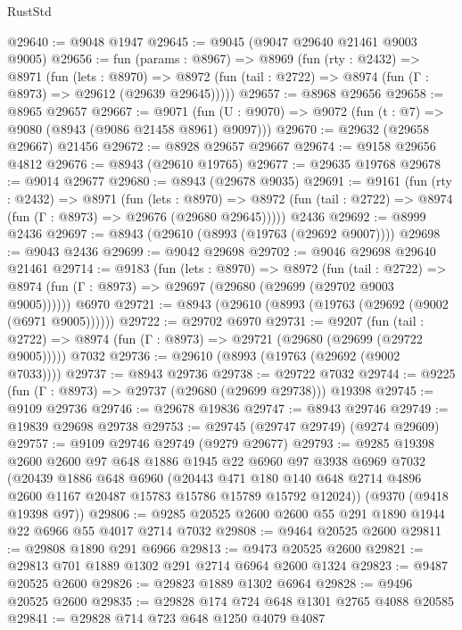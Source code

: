 \begin{lexlean}{RustStd}
\begin{coremodule}
@29640 := @9048 @1947
@29645 := @9045 (@9047 @29640 @21461 @9003 @9005)
@29656 := fun (params : @8967) =>
  @8969
    (fun (rty : @2432) =>
    @8971
      (fun (lets : @8970) =>
      @8972 (fun (tail : @2722) => @8974 (fun (Γ : @8973) => @29612 (@29639 @29645)))))
@29657 := @8968 @29656
@29658 := @8965 @29657
@29667 := @9071
    (fun (U : @9070) => @9072 (fun (t : @7) => @9080 (@8943 (@9086 @21458 @8961) @9097)))
@29670 := @29632 (@29658 @29667) @21456
@29672 := @8928 @29657 @29667
@29674 := @9158 @29656 @4812
@29676 := @8943 (@29610 @19765)
@29677 := @29635 @19768
@29678 := @9014 @29677
@29680 := @8943 (@29678 @9035)
@29691 := @9161
    (fun (rty : @2432) =>
    @8971
      (fun (lets : @8970) =>
      @8972 (fun (tail : @2722) => @8974 (fun (Γ : @8973) => @29676 (@29680 @29645)))))
    @2436
@29692 := @8999 @2436
@29697 := @8943 (@29610 (@8993 (@19763 (@29692 @9007))))
@29698 := @9043 @2436
@29699 := @9042 @29698
@29702 := @9046 @29698 @29640 @21461
@29714 := @9183
    (fun (lets : @8970) =>
    @8972
      (fun (tail : @2722) =>
      @8974 (fun (Γ : @8973) => @29697 (@29680 (@29699 (@29702 @9003 @9005))))))
    @6970
@29721 := @8943 (@29610 (@8993 (@19763 (@29692 (@9002 (@6971 @9005))))))
@29722 := @29702 @6970
@29731 := @9207
    (fun (tail : @2722) => @8974 (fun (Γ : @8973) => @29721 (@29680 (@29699 (@29722 @9005)))))
    @7032
@29736 := @29610 (@8993 (@19763 (@29692 (@9002 @7033))))
@29737 := @8943 @29736
@29738 := @29722 @7032
@29744 := @9225 (fun (Γ : @8973) => @29737 (@29680 (@29699 @29738))) @19398
@29745 := @9109 @29736
@29746 := @29678 @19836
@29747 := @8943 @29746
@29749 := @19839 @29698 @29738
@29753 := @29745 (@29747 @29749) (@9274 @29609)
@29757 := @9109 @29746 @29749 (@9279 @29677)
@29793 := @9285
    @19398
    @2600
    @2600
    @97
    @648
    @1886
    @1945
    @22
    @6960
    @97
    @3938
    @6969
    @7032
    (@20439
      @1886
      @648
      @6960
      (@20443
        @471
        @180
        @140
        @648
        @2714
        @4896
        @2600
        @1167
        @20487
        @15783
        @15786
        @15789
        @15792
        @12024))
    (@9370 (@9418 @19398 @97))
@29806 := @9285 @20525 @2600 @2600 @55 @291 @1890 @1944 @22 @6966 @55 @4017 @2714 @7032
@29808 := @9464 @20525 @2600
@29811 := @29808 @1890 @291 @6966
@29813 := @9473 @20525 @2600
@29821 := @29813 @701 @1889 @1302 @291 @2714 @6964 @2600 @1324
@29823 := @9487 @20525 @2600
@29826 := @29823 @1889 @1302 @6964
@29828 := @9496 @20525 @2600
@29835 := @29828 @174 @724 @648 @1301 @2765 @4088 @20585
@29841 := @29828 @714 @723 @648 @1250 @4079 @4087

\end{coremodule}
\end{lexlean}
